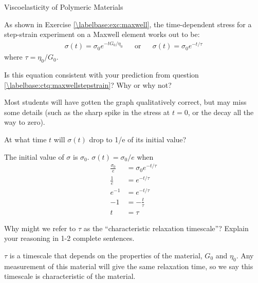 \begin{activity}{Viscoelasticity of Polymeric Materials}
\begin{ctqs}
\end{ctqs}

\begin{infobox}
	As shown in Exercise \ref{\labelbase:exc:maxwell}, the time-dependent stress for a step-strain experiment on a Maxwell element works out to be:
	\begin{align*}
		\sigma(t) = \sigma_0 e^{-t G_0/\eta_0}  && \text{or} && \sigma(t) = \sigma_0 e^{-t /\tau}
	\end{align*}
	where $\tau = \eta_0/G_0$.
\end{infobox}

\begin{ctqs}
	
	\question Is this equation consistent with your prediction from question \ref{\labelbase:ctq:maxwellstepstrain}?  Why or why not?
	
					\begin{solution}[1.75in]
					
						Most students will have gotten the graph qualitatively correct, but may miss some details (such as the sharp spike in the stress at $t=0$, or the decay all the way to zero).
					
					\end{solution}
		
	\question At what time $t$ will $\sigma(t)$ drop to 1/e of its initial value?
	
					\begin{solution}[1.75in]
						The initial value of $\sigma$ is $\sigma_0$.  $\sigma(t) = \sigma_0/e$ when
						\begin{align*}
							\frac{\sigma_0}{e} &= \sigma_0 e^{-t/\tau} \\
							\frac{1}{e} &= e^{-t/\tau}\\
							e^{-1} &= e^{-t/\tau}\\
							-1 &= -\frac{t}{\tau} \\
							t &= \tau
						\end{align*}
					\end{solution}
		
		\question Why might we refer to $\tau$ as the ``characteristic relaxation timescale''?  Explain your reasoning in 1-2 complete sentences.
	
					\begin{solution}[1.5in]
					
						$\tau$ is a timescale that depends on the properties of the material, $G_0$ and $\eta_0$.  Any measurement of this material will give the same relaxation time, so we say this timescale is characteristic of the material.
					

\end{solution}
\end{ctqs}
\end{activity}
